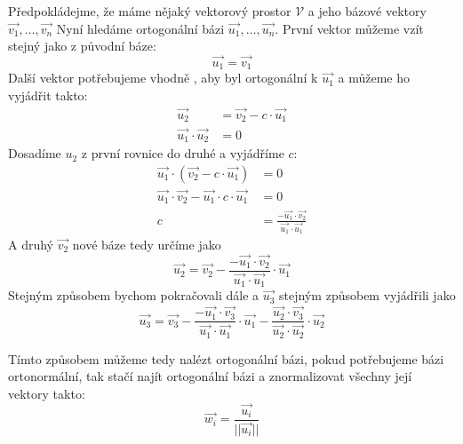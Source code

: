 Předpokládejme, že máme nějaký vektorový prostor $\mathcal{V}$ a jeho bázové
vektory $\vec{v_1}, \ldots, \vec{v_n}$
Nyní hledáme ortogonální bázi $\vec{u_1}, \ldots, \vec{u_n}$.
První vektor můžeme vzít stejný jako z původní báze:
$$\vec{u_1} = \vec{v_1}$$
Další vektor potřebujeme vhodně , aby byl ortogonální
k $\vec{u_1}$ a můžeme ho vyjádřit takto:
\begin{align*}
    \vec{u_2} &= \vec{v_2} - c \cdot \vec{u_1}\\
    \vec{u_1} \cdot \vec{u_2} &= 0
\end{align*}
Dosadíme $u_2$ z první rovnice do druhé a vyjádříme $c$:
\begin{align*}
    \vec{u_1} \cdot (\vec{v_2} - c \cdot \vec{u_1}) &= 0\\
    \vec{u_1} \cdot \vec{v_2} - \vec{u_1} \cdot c \cdot \vec{u_1} &= 0\\
    c &= \frac{-\vec{u_1} \cdot \vec{v_2}}{\vec{u_1}\cdot \vec{u_1}}
\end{align*}
A druhý  $\vec{v_2}$ nové báze tedy určíme jako
$$\vec{u_2} = \vec{v_2} - \frac{-\vec{u_1} \cdot \vec{v_2}}{\vec{u_1}\cdot
    \vec{u_1}} \cdot \vec{u_1}$$
Stejným způsobem bychom pokračovali dále a $\vec{u_3}$ stejným způsobem vyjádřili
jako
$$\vec{u_3} = \vec{v_3} - \frac{-\vec{u_1}\cdot \vec{v_3}}{\vec{u_1} \cdot \vec{u_1}}\cdot
    \vec{u_1} - \frac{\vec{u_2}\cdot \vec{v_3}}{\vec{u_2} \cdot \vec{u_2}}\cdot \vec{u_2}$$

Tímto způsobem můžeme tedy nalézt ortogonální bázi, pokud potřebujeme bázi ortonormální, tak
stačí najít ortogonální bázi a znormalizovat všechny její vektory takto:
$$\vec{w_i} = \frac{\vec{u_i}}{||\vec{u_i}||}$$

